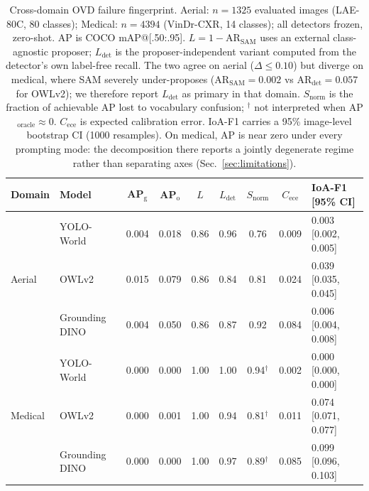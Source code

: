 \begin{table}[t]
  \centering
  \caption{Cross-domain OVD failure fingerprint. Aerial: $n{=}1325$ evaluated images
  (LAE-80C, 80 classes); Medical: $n{=}4394$ (VinDr-CXR, 14 classes); all detectors
  frozen, zero-shot. AP is COCO mAP@[.50:.95].
  $L{=}1{-}\mathrm{AR}_{\mathrm{SAM}}$ uses an external class-agnostic proposer;
  $L_{\mathrm{det}}$ is the proposer-independent variant computed from the detector's own
  label-free recall. The two agree on aerial ($\Delta{\le}0.10$) but diverge on medical,
  where SAM severely under-proposes ($\mathrm{AR}_{\mathrm{SAM}}{=}0.002$ vs
  $\mathrm{AR}_{\mathrm{det}}{=}0.057$ for OWLv2); we therefore report $L_{\mathrm{det}}$
  as primary in that domain.
  $S_{\mathrm{norm}}$ is the fraction of achievable AP lost to vocabulary confusion;
  $^{\dagger}$ not interpreted when AP$_{\mathrm{oracle}}{\approx}0$.
  $C_{\mathrm{ece}}$ is expected calibration error. IoA-F1 carries a 95\% image-level
  bootstrap CI (1000 resamples).
  On medical, AP is near zero under every prompting mode: the decomposition there reports a
  jointly degenerate regime rather than separating axes (Sec.~\ref{sec:limitations}).}
  \label{tab:fingerprint}
  \begin{tabular}{ll cc cc c c l}
    \toprule
    Domain & Model & AP$_{\mathrm{g}}$ & AP$_{\mathrm{o}}$ & $L$ & $L_{\mathrm{det}}$ & $S_{\mathrm{norm}}$ & $C_{\mathrm{ece}}$ & IoA-F1 [95\% CI] \\
    \midrule
    \multirow{3}{*}{Aerial}
     & YOLO-World     & 0.004 & 0.018 & 0.86 & 0.96 & 0.76 & 0.009 & 0.003 [0.002, 0.005] \\
     & OWLv2          & 0.015 & 0.079 & 0.86 & 0.84 & 0.81 & 0.024 & 0.039 [0.035, 0.045] \\
     & Grounding DINO & 0.004 & 0.050 & 0.86 & 0.87 & 0.92 & 0.084 & 0.006 [0.004, 0.008] \\
    \midrule
    \multirow{3}{*}{Medical}
     & YOLO-World     & 0.000 & 0.000 & 1.00 & 1.00 & 0.94$^{\dagger}$ & 0.002 & 0.000 [0.000, 0.000] \\
     & OWLv2          & 0.000 & 0.001 & 1.00 & 0.94 & 0.81$^{\dagger}$ & 0.011 & 0.074 [0.071, 0.077] \\
     & Grounding DINO & 0.000 & 0.000 & 1.00 & 0.97 & 0.89$^{\dagger}$ & 0.085 & 0.099 [0.096, 0.103] \\
    \bottomrule
  \end{tabular}
\end{table}

